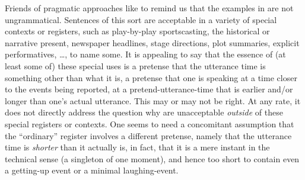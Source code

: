 %
Friends of pragmatic approaches like to remind us that the examples in \LLast
are not ungrammatical. Sentences of this sort are acceptable in a variety of
special contexts or registers, such as play-by-play sportscasting, the
historical or narrative present, newspaper headlines, stage directions, plot
summaries, explicit performatives, \dots, to name some. It is appealing to say
that the essence of (at least some of) these special uses is a pretense that the
utterance time is something other than what it is, a pretense that one is
speaking at a time closer to the events being reported, at a
pretend-utterance-time that is earlier and/or longer than one's actual
utterance. This may or may not be right. At any rate, it does not directly
address the question why \LLast[a-c] are unacceptable \emph{outside} of these
special registers or contexts. %
%
One seems to need a concomitant assumption that the ``ordinary'' register
involves a different pretense, namely that the utterance time is \emph{shorter}
than it actually is, in fact, that it is a mere instant in the technical sense
(a singleton of one moment), and hence too short to contain even a getting-up
event or a minimal laughing-event.

